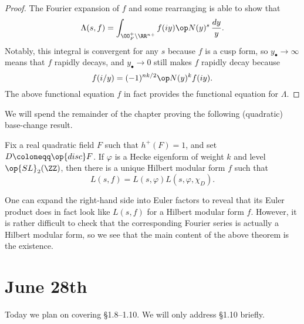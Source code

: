 \documentclass{article}
\begin{document}
\begin{proof}
	The Fourier expansion of $f$ and some rearranging is able to show that
	\[\Lambda(s,f)=\int_{\OO_F^+\backslash\RR^{n+}}f(iy)\op N(y)^s\,\frac{dy}y.\]
	Notably, this integral is convergent for any $s$ because $f$ is a cusp form, so $y_\bullet\to\infty$ means that $f$ rapidly decays, and $y_\bullet\to0$ still makes $f$ rapidly decay because
	\[f(i/y)=(-1)^{nk/2}\op N(y)^kf(iy).\]
	The above functional equation $f$ in fact provides the functional equation for $\Lambda$.
\end{proof}
We will spend the remainder of the chapter proving the following (quadratic) base-change result.
\begin{theorem}
	Fix a real quadratic field $F$ such that $h^+(F)=1$, and set $D\coloneqq\op{disc}F$. If $\varphi$ is a Hecke eigenform of weight $k$ and level $\op{SL}_2(\ZZ)$, then there is a unique Hilbert modular form $f$ such that
	\[L(s,f)=L(s,\varphi)L(s,\varphi,\chi_D).\]
\end{theorem}
\begin{remark}
	One can expand the right-hand side into Euler factors to reveal that its Euler product does in fact look like $L(s,f)$ for a Hilbert modular form $f$. However, it is rather difficult to check that the corresponding Fourier series is actually a Hilbert modular form, so we see that the main content of the above theorem is the existence.
\end{remark}

\section{June 28th}
Today we plan on covering \S1.8--1.10. We will only address \S1.10 briefly.

\end{document}
